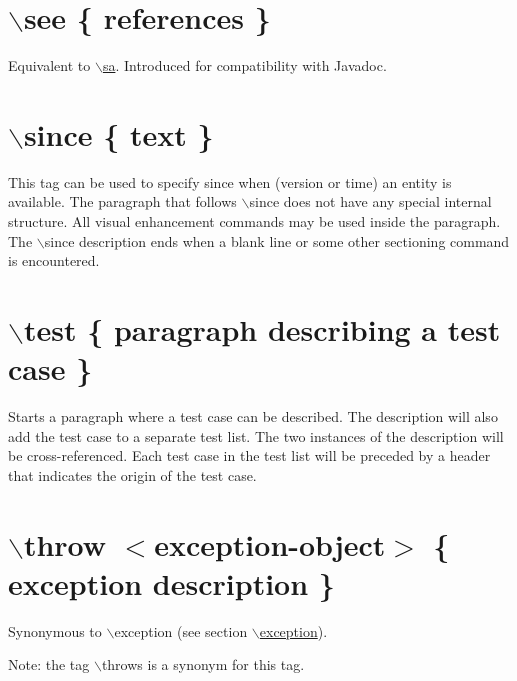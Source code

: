  \hypertarget{commands_cmdsee}{}\section{$\backslash$see \{ references \}}\label{commands_cmdsee}
 Equivalent to \hyperlink{commands_cmdsa}{$\backslash$sa}. Introduced for compatibility with Javadoc.



 \hypertarget{commands_cmdsince}{}\section{$\backslash$since \{ text \}}\label{commands_cmdsince}
 This tag can be used to specify since when (version or time) an entity is available. The paragraph that follows $\backslash$since does not have any special internal structure. All visual enhancement commands may be used inside the paragraph. The $\backslash$since description ends when a blank line or some other sectioning command is encountered.



 \hypertarget{commands_cmdtest}{}\section{$\backslash$test \{ paragraph describing a test case \}}\label{commands_cmdtest}
 Starts a paragraph where a test case can be described. The description will also add the test case to a separate test list. The two instances of the description will be cross-\/referenced. Each test case in the test list will be preceded by a header that indicates the origin of the test case.



 \hypertarget{commands_cmdthrow}{}\section{$\backslash$throw $<$exception-\/object$>$ \{ exception description \}}\label{commands_cmdthrow}
 Synonymous to $\backslash$exception (see section \hyperlink{commands_cmdexception}{$\backslash$exception}).

\begin{DoxyParagraph}{Note: }
the tag $\backslash$throws is a synonym for this tag.
\end{DoxyParagraph}


